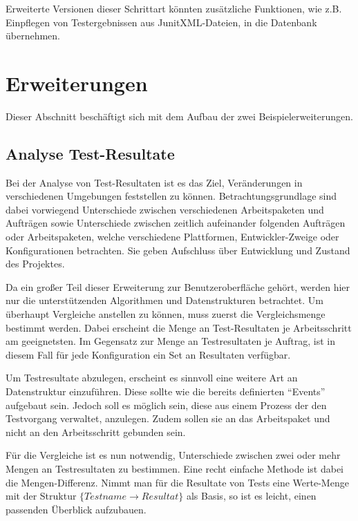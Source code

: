 Erweiterte Versionen dieser Schrittart könnten zusätzliche Funktionen,
wie z.B. Einpflegen von Testergebnissen aus JunitXML-Dateien, in die Datenbank übernehmen.


\section{Erweiterungen}
\label{sec:design:erweiterungen}

Dieser Abschnitt beschäftigt sich mit dem Aufbau der zwei Beispielerweiterungen.

\subsection{Analyse Test-Resultate}

Bei der Analyse von Test-Resultaten ist es das Ziel,
Veränderungen in verschiedenen Umgebungen feststellen zu können.
Betrachtungsgrundlage sind dabei vorwiegend Unterschiede zwischen verschiedenen Arbeitspaketen und Aufträgen sowie Unterschiede zwischen zeitlich aufeinander folgenden Aufträgen oder Arbeitspaketen, welche verschiedene Plattformen, Entwickler-Zweige oder Konfigurationen betrachten. Sie geben Aufschluss über Entwicklung und Zustand des Projektes.

Da ein großer Teil dieser Erweiterung zur Benutzeroberfläche gehört,
werden hier nur die unterstützenden Algorithmen und Datenstrukturen betrachtet.
Um überhaupt Vergleiche anstellen zu können, muss zuerst die Vergleichsmenge bestimmt werden. Dabei erscheint die Menge an Test-Resultaten je Arbeitsschritt am geeignetsten. Im Gegensatz zur Menge an Testresultaten je Auftrag,
ist in diesem Fall für jede Konfiguration ein Set an Resultaten verfügbar.

Um Testresultate abzulegen, erscheint es sinnvoll eine weitere Art an Datenstruktur einzuführen.
Diese sollte wie die bereits definierten ``Events'' aufgebaut sein.
Jedoch soll es möglich sein, diese aus einem Prozess der den Testvorgang verwaltet,
anzulegen. Zudem sollen sie an das Arbeitspaket und nicht an den Arbeitsschritt gebunden sein.

Für die Vergleiche ist es nun notwendig,
Unterschiede zwischen zwei oder mehr Mengen an Testresultaten zu bestimmen.
Eine recht einfache Methode ist dabei die Mengen-Differenz.
Nimmt man für die Resultate von Tests eine Werte-Menge mit der Struktur $\{ Testname \rightarrow Resultat \}$ als Basis,
so ist es leicht, einen passenden Überblick aufzubauen.

